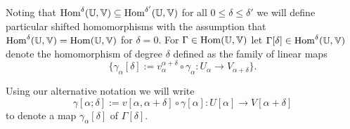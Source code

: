 Noting that $\mathrm{Hom}^\delta(\mathbb{U},\mathbb{V})\subseteq\mathrm{Hom}^{\delta'}(\mathbb{U},\mathbb{V})$ for all $0\leq\delta\leq\delta'$ we will define particular shifted homomorphisms with the assumption that $\mathrm{Hom}^\delta(\mathbb{U},\mathbb{V}) = \mathrm{Hom}(\mathbb{U},\mathbb{V})$ for $\delta = 0$.
For $\Gamma\in\mathrm{Hom}(\mathbb{U},\mathbb{V})$ let $\Gamma[\delta]\in\mathrm{Hom}^\delta(\mathbb{U},\mathbb{V})$ denote the homomorphism of degree $\delta$ defined as the family of linear maps
\[\{\gamma_\alpha[\delta] := v_\alpha^{\alpha+\delta}\circ \gamma_\alpha : U_\alpha\to V_{\alpha+\delta}\}.\]

Using our alternative notation we will write
\[\gamma[\alpha;\delta] := v[\alpha,\alpha+\delta]\circ\gamma[\alpha] : U[\alpha]\to V[\alpha+\delta]\]
to denote a map $\gamma_\alpha[\delta]$ of $\Gamma[\delta]$.


